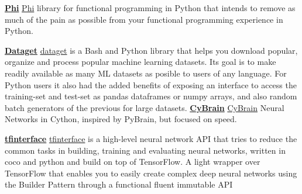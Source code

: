 \begin{cventries}
  \cventry
    {\href{https://github.com/cgarciae/phi}{\textbf{Phi}}}
    {}
    {}
    {}
    {
      \href{https://github.com/cgarciae/phi}{Phi} library for functional programming in Python that intends to remove as much of the pain as possible from your functional programming experience in Python.
    }

  \cventry
    {\href{https://github.com/cgarciae/dataget}{\textbf{Dataget}}}
    {}
    {}
    {}
    {
    \href{https://github.com/cgarciae/dataget}{dataget}  is a Bash and Python library that helps you download popular, organize and process popular machine learning datasets. Its goal is to make readily available as many ML datasets as posible to users of any language. For Python users it also had the added benefits of exposing an interface to access the training-set and test-set as pandas dataframes or numpy arrays, and also random batch generators of the previous for large datasets.
    }
  \cventry
    {\href{https://github.com/cgarciae/cybrain}{\textbf{CyBrain}}}
    {}
    {}
    {}
    {
    \href{https://github.com/cgarciae/cybrain}{CyBrain} Neural Networks in Cython, inspired by PyBrain, but focused on speed.
    }

  \cventry
    {\href{https://github.com/cgarciae/tfinterface}{\textbf{tfinterface}}}
    {}
    {}
    {}
    {
    \href{https://github.com/cgarciae/tfinterface}{tfinterface} is a high-level neural network API that tries to reduce the common tasks in building, training and evaluating neural networks, written in coco and python and build on top of TensorFlow. A light wrapper over TensorFlow that enables you to easily create complex deep neural networks using the Builder Pattern through a functional fluent immutable API
    } 
\end{cventries}
